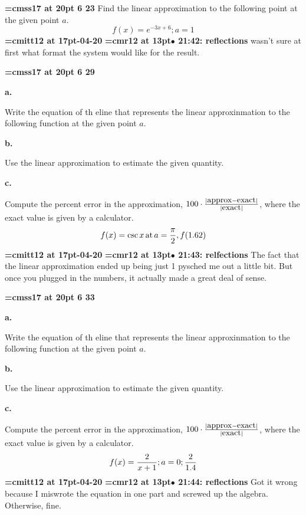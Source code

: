 {\medskip\noindent\bf\font\titlefont=cmss17 at 20pt 6 23}\medskip
Find the linear approximation to the following point at the
given point $a$.
$$
f(x) = e^{-3x + 6}; a = 1
$$
{\medskip\noindent\bf\font\titlefont=cmitt12 at 17pt-04-20}\medskip
{\smallskip\noindent\bf\font\titlefont=cmr12 at 13pt\titlefont $\bullet$ 21:42: reflections}\smallskip
wasn't sure at first what format the system would like for the result.
\par

{\medskip\noindent\bf\font\titlefont=cmss17 at 20pt 6 29}\medskip
{\par \bf a.}
Write the equation of th eline that represents the linear approxinmation
to the following function at the given point $a$.
{\par \bf b.}
Use the linear approximation to estimate the given quantity.
{\par \bf c.}
Compute the percent error in the approximation, $100 \cdot {|\hbox{approx} - \hbox{exact}| \over |\hbox{exact}|}$,
where the exact value is given by a calculator.
$$
f(x) = \csc x \, \hbox{at} \, a = {\pi \over 2}, f(1.62)
$$
{\medskip\noindent\bf\font\titlefont=cmitt12 at 17pt-04-20}\medskip
{\smallskip\noindent\bf\font\titlefont=cmr12 at 13pt\titlefont $\bullet$ 21:43: relfections}\smallskip
The fact that the linear approximation ended up being just 1 pysched me out a little bit. But once you plugged in the numbers, it actually made a great deal of sense.
\par

{\medskip\noindent\bf\font\titlefont=cmss17 at 20pt 6 33}\medskip
{\par \bf a.}
Write the equation of th eline that represents the linear approxinmation
to the following function at the given point $a$.
{\par \bf b.}
Use the linear approximation to estimate the given quantity.
{\par \bf c.}
Compute the percent error in the approximation, $100 \cdot {|\hbox{approx} - \hbox{exact}| \over |\hbox{exact}|}$,
where the exact value is given by a calculator.
$$
f(x) = {2 \over x + 1}; a = 0; {2 \over 1.4}
$$
{\medskip\noindent\bf\font\titlefont=cmitt12 at 17pt-04-20}\medskip
{\smallskip\noindent\bf\font\titlefont=cmr12 at 13pt\titlefont $\bullet$ 21:44: reflections}\smallskip
Got it wrong because I miswrote the equation in one part and screwed up the algebra. Otherwise, fine.
\par


